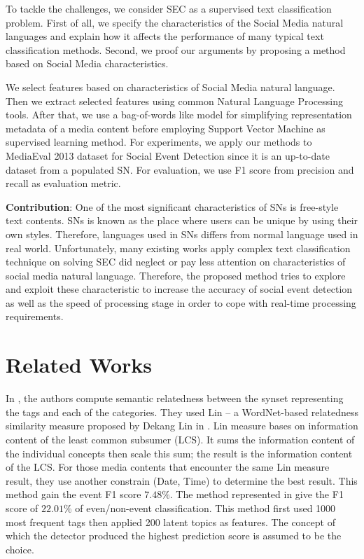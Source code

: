 \documentclass{llncs}
\begin{document}
To tackle the challenges, we consider SEC as a supervised text classification problem. First of all, we specify the characteristics of the Social Media natural languages and explain how it affects the performance of many typical text classification methods. Second, we proof our arguments by proposing a method based on Social Media characteristics. 

We select features based on characteristics of Social Media natural language. Then we extract selected features using common Natural Language Processing tools. After that, we use a bag-of-words like model for simplifying representation metadata of a media content before employing Support Vector Machine as supervised learning method. For experiments, we apply our methods to MediaEval 2013 dataset \cite{reuter2013social} for Social Event Detection since it is an up-to-date dataset from a populated SN. For evaluation, we use F1 score from precision and recall as evaluation metric.

\textbf{Contribution}: One of the most significant characteristics of SNs is free-style text contents. SNs is known as the place where users can be unique by using their own styles. Therefore, languages used in SNs differs from normal language used in real world. Unfortunately, many existing works apply complex text classification technique on solving SEC did neglect or pay less attention on characteristics of social media natural language. Therefore, the proposed method tries to explore and exploit these characteristic to increase the accuracy of social event detection as well as the speed of processing stage in order to cope with real-time processing requirements. 

\section{Related Works}

In \cite{itikavit}, the authors compute semantic relatedness between the synset representing the tags and each of the categories. They used Lin – a WordNet-based relatedness similarity measure proposed by Dekang Lin in \cite{lin1998information}. Lin measure bases on information content of the least common subsumer (LCS). It sums the information content of the individual concepts then scale this sum; the result is the information content of the LCS. For those media contents that encounter the same Lin measure result, they use another constrain (Date, Time) to determine the best result. This method gain the event F1 score $7.48\%$. The method represented in \cite{schinas2012certh} give the F1 score of $22.01\%$ of even/non-event classification. This method first used 1000 most frequent tags then applied 200 latent topics as features. The concept of which the detector produced the highest prediction score is assumed to be the choice. 
\end{document}
